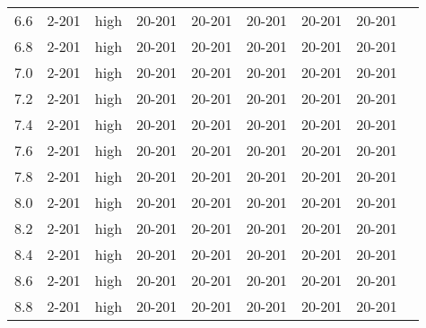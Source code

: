 \documentclass{article}
\begin{document}
\begin{center}
\begin{center}
\begin{tabular}{| c | c | c | c | c | c | c | c | c |}
      6.6 & 2-201 & high & 20-201 & 20-201 & 20-201 & 20-201 & 20-201 &\\
      6.8 & 2-201 & high & 20-201 & 20-201 & 20-201 & 20-201 & 20-201 &\\
      7.0 & 2-201 & high & 20-201 & 20-201 & 20-201 & 20-201 & 20-201 &\\
      7.2 & 2-201 & high & 20-201 & 20-201 & 20-201 & 20-201 & 20-201 &\\
      7.4 & 2-201 & high & 20-201 & 20-201 & 20-201 & 20-201 & 20-201 &\\
      7.6 & 2-201 & high & 20-201 & 20-201 & 20-201 & 20-201 & 20-201 &\\
      7.8 & 2-201 & high & 20-201 & 20-201 & 20-201 & 20-201 & 20-201 &\\
      8.0 & 2-201 & high & 20-201 & 20-201 & 20-201 & 20-201 & 20-201 &\\
      8.2 & 2-201 & high & 20-201 & 20-201 & 20-201 & 20-201 & 20-201 &\\
      8.4 & 2-201 & high & 20-201 & 20-201 & 20-201 & 20-201 & 20-201 &\\
      8.6 & 2-201 & high & 20-201 & 20-201 & 20-201 & 20-201 & 20-201 &\\
      8.8 & 2-201 & high & 20-201 & 20-201 & 20-201 & 20-201 & 20-201 &\\
      \hline
    \end{tabular}
    \end{center}

\end{center}
\end{document}
